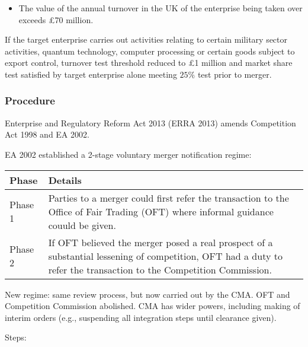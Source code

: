 \documentclass[
]{article}
\providecommand{\tightlist}{%
  \setlength{\itemsep}{0pt}\setlength{\parskip}{0pt}}
\begin{document}
\begin{enumerate}
\begin{enumerate}
    \begin{itemize}
    \tightlist
    \item
      The value of the annual turnover in the UK of the enterprise being
      taken over exceeds £70 million.
    \end{itemize}
  \end{enumerate}
\end{enumerate}

If the target enterprise carries out activities relating to certain
military sector activities, quantum technology, computer processing or
certain goods subject to export control, turnover test threshold reduced
to £1 million and market share test satisfied by target enterprise alone
meeting {\(25\%\)} test prior to merger.

\hypertarget{procedure}{%
\subsubsection{Procedure}\label{procedure}}

Enterprise and Regulatory Reform Act 2013 (ERRA 2013) amends Competition
Act 1998 and EA 2002.

EA 2002 established a 2-stage voluntary merger notification regime:

\begin{longtable}[]{@{}ll@{}}
\toprule()
Phase & Details \\
\midrule()
\endhead
Phase 1 & Parties to a merger could first refer the transaction to the
Office of Fair Trading (OFT) where informal guidance couuld be given. \\
Phase 2 & If OFT believed the merger posed a real prospect of a
substantial lessening of competition, OFT had a duty to refer the
transaction to the Competition Commission. \\
\bottomrule()
\end{longtable}

New regime: same review process, but now carried out by the CMA. OFT and
Competition Commission abolished. CMA has wider powers, including making
of interim orders (e.g., suspending all integration steps until
clearance given).

Steps:
\end{document}
